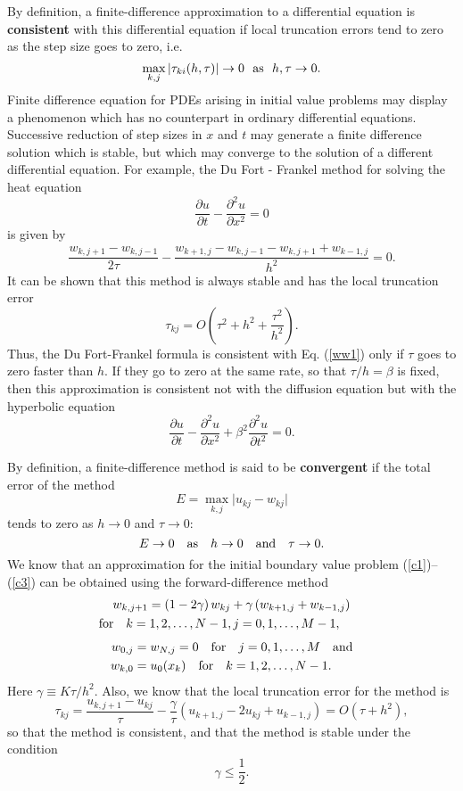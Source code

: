 
By definition, a finite-difference approximation to a differential equation
is {\bf consistent} with this differential equation if local truncation errors
tend to zero as the step size goes to zero, i.e.
\[
\max_{k,j}\vert \tau_{ki}(h,\tau)\vert \to 0 \ \ {\rm as} \ \ h,\tau \to 0.
\]
Finite difference equation for PDEs arising in initial value
problems may display a phenomenon which has no counterpart in
ordinary differential equations. Successive reduction of step
sizes in $x$ and $t$ may generate a finite difference solution
which is stable, but which may converge to the solution of a
different differential equation. For example, the Du Fort -
Frankel method for solving the heat equation
\begin{equation}
\frac{\partial u}{\partial t}- \frac{\partial^{2}u}{\partial
x^{2}}=0 \label{ww1}
\end{equation}
is given by
\[
\frac{w_{k,j+1}-w_{k,j-1}}{2\tau}- \frac{w_{k+1,
j}-w_{k,j-1}-w_{k,j+1}+w_{k-1,j}}{h^{2}}=0.
\]
It can be shown that this method is always stable and has
the local truncation error
\[
\tau_{kj}=O\left(\tau^2+h^2+\frac{\tau^2}{h^2}\right).
\]
Thus, the Du Fort-Frankel formula is consistent with Eq. (\ref{ww1}) only
if $\tau$ goes to zero faster than $h$. If they go to zero
at the same rate, so that $\tau/h=\beta$ is fixed, then this approximation
is consistent not with the diffusion equation but with the hyperbolic equation
\[
\frac{\partial u}{\partial t}- \frac{\partial^{2}u}{\partial
x^{2}}+ \beta^2\frac{\partial^{2}u}{\partial t^{2}}=0.
\]





    
By definition, a finite-difference method is said to be {\bf convergent}
if the total error of the method
\[
E=\max\limits_{k,j}\vert u_{kj}-w_{kj}\vert
\]
tends to zero as $h\to 0$ and $\tau\to 0$:
\[
E \to 0 \quad {\rm as} \quad h\to 0 \quad {\rm and} \quad \tau\to 0.
\]
We know that an approximation for the initial boundary value problem (\ref{c1})--(\ref{c3})
can be obtained using the forward-difference method
\begin{multline}
w_{k,j+1}=\left(1-2\gamma\right)w_{kj}+
\gamma\left( w_{k+1, j}+w_{k-1,j}\right)\\ {\rm for}
\quad k=1,2,\dots,N-1, 
j=0,1,\dots,M-1, \quad\quad \label{c4}
\end{multline}
\begin{align}
w_{0,j}&=w_{N,j}=0  \quad {\rm for}
\quad j=0,1,\dots,M \quad {\rm and} 
 \label{c5} \\w_{k,0}&=u_{0}(x_{k}) \quad {\rm for}
\quad k=1,2,\dots,N-1.\notag
\end{align}
Here $\gamma\equiv K\tau/h^{2}$.
Also, we know that the local truncation error for the method is
\begin{equation}
\tau_{kj}= \frac{u_{k,j+1}-u_{kj}}{\tau}-\frac{\gamma}{\tau}
\left(u_{k+1,j}-2u_{kj}+u_{k-1,j}\right)=O(\tau+h^{2}), \label{c6}
\end{equation}
so that the method is consistent,
and that the method is stable under the condition
\begin{equation}
\gamma \leq \frac{1}{2}. \label{c7}
\end{equation}


